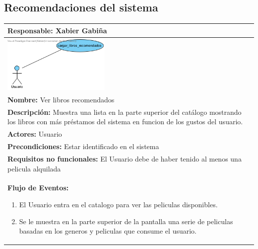 \documentclass{report}
\begin{document}
        \subsection{Recomendaciones del sistema}
            \begin{center}
                \begin{tabular}{|p{\linewidth}|}
                    \hline
                    \textbf{Responsable:} Xabier Gabiña\\
                    \hline
                    \begin{minipage}{\textwidth}
                        \centering
                        \includegraphics[width=0.4\textwidth]{./img/casos_uso/recom_lib.png}
                    \end{minipage}\\
                    \hline
                    \textbf{Nombre:} Ver libros recomendados\\
                    \hline
                    \textbf{Descripción:} Muestra una lista en la parte superior del catálogo mostrando los libros con más préstamos del sistema en funcion de los gustos del usuario.\\
                    \hline
                    \textbf{Actores:} Usuario\\
                    \hline
                    \textbf{Precondiciones:} Estar identificado en el sistema\\
                    \hline
                    \textbf{Requisitos no funcionales:} El Usuario debe de haber tenido al menos una pelicula alquilada\\
                    \hline
                    \textbf{Flujo de Eventos:}
                    \begin{enumerate}
                        \item El Usuario entra en el catalogo para ver las peliculas disponibles.
                        \item Se le muestra en la parte superior de la pantalla una serie de peliculas basadas en los generos y peliculas que consume el usuario.
                    \end{enumerate}\\

\end{tabular}
\end{center}
\end{document}
